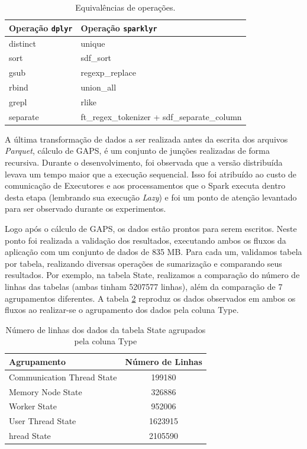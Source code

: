 \begin{table}[H]
\centering
\begin{tabular}{l l} \toprule
\textbf{Operação \texttt{dplyr}}  &  \textbf{Operação \texttt{sparklyr}}\\ 
\midrule
distinct	& unique  \\
sort		& sdf\_sort \\
gsub		& regexp\_replace\\
rbind		& union\_all\\
grepl		& rlike\\
separate	& ft\_regex\_tokenizer + sdf\_separate\_column       \\
\end{tabular}
\caption{Equivalências de operações.}
\label{tab:equivalence}
\end{table}

A última transformação de dados a ser realizada antes da escrita dos arquivos 
\textit{Parquet}, cálculo de GAPS, é um conjunto de junções realizadas 
de forma recursiva. Durante o desenvolvimento, foi observada que a versão 
distribuída levava um tempo maior que a execução sequencial. Isso foi atribuído 
ao custo de comunicação de Executores e aos processamentos que o Spark 
executa dentro desta etapa (lembrando sua execução \emph{Lazy}) e foi um ponto 
de atenção levantado para ser observado durante os experimentos.

Logo após o cálculo de GAPS, os dados estão prontos para serem escritos. Neste 
ponto foi realizada a validação dos resultados, executando ambos os 
fluxos da aplicação com um conjunto de dados de 835 MB. Para cada um, validamos 
tabela por tabela, realizando diversas operações de sumarização e comparando 
seus resultados. Por exemplo, na tabela State, realizamos a comparação do 
número de linhas das tabelas (ambas tinham 5207577 linhas), além da comparação 
de 7 agrupamentos diferentes. A tabela \ref{tab:validation} reproduz os dados 
observados em ambos os fluxos ao realizar-se o agrupamento dos dados pela coluna 
Type.

\begin{table}[H]
\centering
\begin{tabular}{l c} \toprule
\textbf{Agrupamento}  &  \textbf{Número de Linhas} \\ 
\midrule
Communication Thread State	& 199180 \\
Memory Node State		& 326886 \\
Worker State			& 952006 \\
User Thread State		& 1623915 \\
hread State			& 2105590 \\
\end{tabular}
\caption{Número de linhas dos dados da tabela State agrupados pela coluna Type}
\label{tab:validation}
\end{table}

